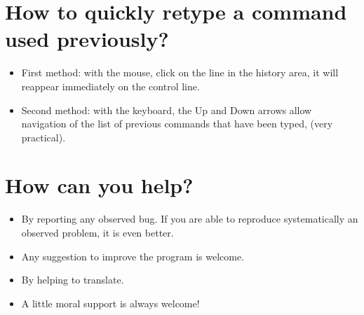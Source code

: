 \section{How to quickly retype a command used previously?}
\begin{itemize}
\item First method: with the mouse, click on the line in the history area, it will reappear immediately on the control line.
\item Second method: with the keyboard, the Up and Down arrows allow navigation of the list of previous commands that have been typed, (very practical).
\end{itemize}
 \section{How can you help?}
\begin{itemize}
\item By reporting any observed bug. If you are able to reproduce systematically an observed problem, it is even better.
\item Any suggestion to improve the program is welcome.
\item By helping to translate. 
\item A little moral support is always welcome!
\end{itemize}